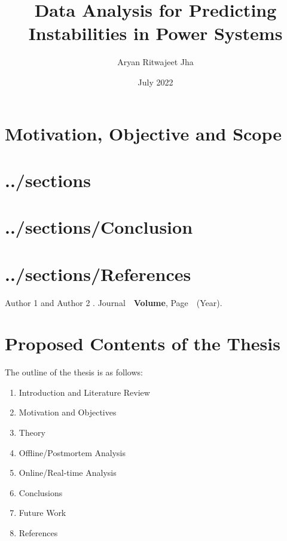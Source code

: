 \documentclass[MS,synopsis]{iitddiss}
\title{Data Analysis for Predicting Instabilities in Power Systems}
\author{Aryan Ritwajeet Jha}
\date{July 2022}
\begin{document}
\maketitle



\setcounter{page}{0}


\section{Motivation, Objective and Scope}

\section{../sections}

\section{../sections/Conclusion}

\section{../sections/References}


\begin{singlespace}
\begin{thebibliography}{10}

Author 1 and Author 2
.
\newblock Journal\ \ {\bf Volume}, Page\ \ (Year).
\end{thebibliography}

\end{singlespace}

\section{Proposed Contents of the Thesis}
The outline of the thesis is as follows:
\begin{enumerate}
\item Introduction and Literature Review
\item Motivation and Objectives
\item Theory
\item Offline/Postmortem Analysis
\item Online/Real-time Analysis
\item Conclusions
\item Future Work
\item References
\end{enumerate}
\end{document}
